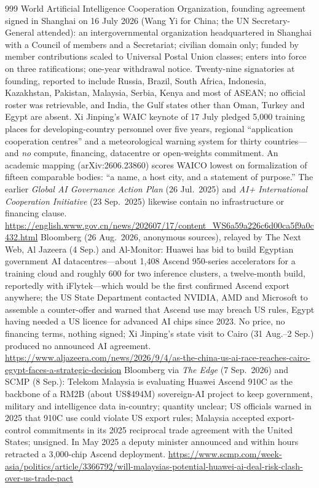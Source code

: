 \begin{thebibliography}{999}
 World Artificial Intelligence Cooperation Organization, founding agreement signed in Shanghai on 16 July 2026 (Wang Yi for China; the UN Secretary-General attended): an intergovernmental organization headquartered in Shanghai with a Council of members and a Secretariat; civilian domain only; funded by member contributions scaled to Universal Postal Union classes; enters into force on three ratifications; one-year withdrawal notice. Twenty-nine signatories at founding, reported to include Russia, Brazil, South Africa, Indonesia, Kazakhstan, Pakistan, Malaysia, Serbia, Kenya and most of ASEAN; no official roster was retrievable, and India, the Gulf states other than Oman, Turkey and Egypt are absent. Xi Jinping's WAIC keynote of 17 July pledged 5{,}000 training places for developing-country personnel over five years, regional ``application cooperation centres'' and a meteorological warning system for thirty countries---and \emph{no} compute, financing, datacentre or open-weights commitment. An academic mapping (arXiv:2606.23860) scores WAICO lowest on formalization of fifteen comparable bodies: ``a name, a host city, and a statement of purpose.'' The earlier \emph{Global AI Governance Action Plan} (26 Jul.\ 2025) and \emph{AI+ International Cooperation Initiative} (23 Sep.\ 2025) likewise contain no infrastructure or financing clause. \url{https://english.www.gov.cn/news/202607/17/content_WS6a59a226c6d00ca5f9a0c432.html}
 Bloomberg (26 Aug.\ 2026, anonymous sources), relayed by The Next Web, Al Jazeera (4 Sep.) and Al-Monitor: Huawei has bid to build Egyptian government AI datacentres---about 1{,}408 Ascend 950-series accelerators for a training cloud and roughly 600 for two inference clusters, a twelve-month build, reportedly with iFlytek---which would be the first confirmed Ascend export anywhere; the US State Department contacted NVIDIA, AMD and Microsoft to assemble a counter-offer and warned that Ascend use may breach US rules, Egypt having needed a US licence for advanced AI chips since 2023. No price, no financing terms, nothing signed; Xi Jinping's state visit to Cairo (31 Aug.--2 Sep.) produced no announced AI agreement. \url{https://www.aljazeera.com/news/2026/9/4/as-the-china-us-ai-race-reaches-cairo-egypt-faces-a-strategic-decision}
 Bloomberg via \emph{The Edge} (7 Sep.\ 2026) and SCMP (8 Sep.): Telekom Malaysia is evaluating Huawei Ascend 910C as the backbone of a RM2B (about US\$494M) sovereign-AI project to keep government, military and intelligence data in-country; quantity unclear; US officials warned in 2025 that 910C use could violate US export rules; Malaysia accepted export-control commitments in its 2025 reciprocal trade agreement with the United States; unsigned. In May 2025 a deputy minister announced and within hours retracted a 3{,}000-chip Ascend deployment. \url{https://www.scmp.com/week-asia/politics/article/3366792/will-malaysias-potential-huawei-ai-deal-risk-clash-over-us-trade-pact}

\end{thebibliography}

